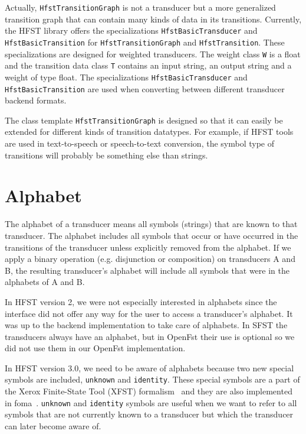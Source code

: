 \documentclass{llncs}
\begin{document}
Actually, \texttt{HfstTransitionGraph} is not a transducer but a more
generalized transition graph that can contain many kinds of data in
its transitions. Currently, the HFST library offers the specializations 
\texttt{HfstBasicTransducer} and \texttt{HfstBasicTransition} 
for \texttt{HfstTransitionGraph} and \texttt{HfstTransition}.
These specializations are designed for weighted 
transducers. The weight class \texttt{W} is a float and the transition data
class \texttt{T} contains an input string, an output string and a weight of
type float. The specializations \texttt{HfstBasicTransducer} and
\texttt{HfstBasicTransition} are used when converting between different
transducer backend formats.

The class template \texttt{HfstTransitionGraph} is designed so that it can
easily be extended for different kinds of transition datatypes. For
example, if HFST tools are used in text-to-speech or speech-to-text
conversion, the symbol type of transitions will probably be something
else than strings.



\section{Alphabet}

The alphabet of a transducer means all symbols (strings) that are
known to that transducer. The alphabet includes all symbols that occur 
or have occurred in the transitions of the transducer unless explicitly
removed from the alphabet. 
If we apply a binary operation (e.g. disjunction or composition) on 
transducers A and B, the resulting transducer's alphabet will include
all symbols that were in the alphabets of A and B. 

In HFST version 2, we were not especially interested in alphabets 
since the interface did not offer any way for the user to access a 
transducer's alphabet. It was up to the backend implementation to take
care of alphabets. In SFST the transducers always have an alphabet,
but in OpenFst their use is optional so we did not use them in our
OpenFst implementation.
 
In HFST version 3.0, we need to be aware of alphabets because two new
special symbols are included, \texttt{unknown} and \texttt{identity}. 
These special symbols are a part of the Xerox Finite-State Tool (XFST) 
formalism~\cite[page x]{beesley/2003} and they are also implemented in
foma~\cite{hulden/2009}. \texttt{unknown} and \texttt{identity} symbols 
are useful when we want to refer to all symbols that are not currently 
known to a transducer but which the transducer can later become aware of. 
\end{document}
